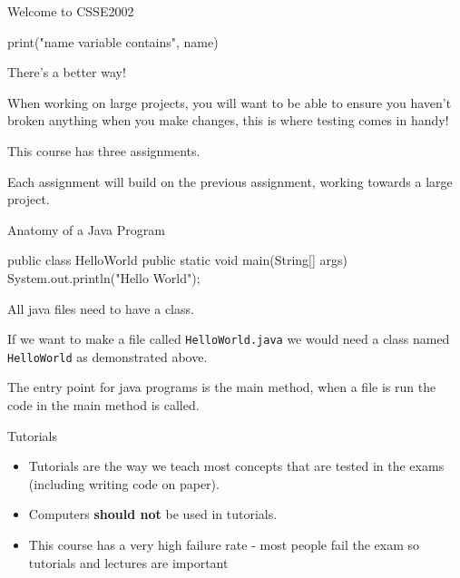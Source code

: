 \documentclass[week2]{csse2002}
\begin{document}
\begin{topic}{Welcome to CSSE2002}
\begin{subtopic}{5}
\begin{python}
print("name variable contains", name)
\end{python}

There's a better way!
\end{subtopic}

\begin{subtopic}{6}
When working on large projects, you will want to be able to ensure you haven't broken anything when you make changes, this is where testing comes in handy!
\end{subtopic}

\begin{subtopic}{7}
This course has three assignments.

Each assignment will build on the previous assignment, working towards a large project.
\end{subtopic}

\end{topic}

\begin{topic}{Anatomy of a Java Program}
\begin{java}
public class HelloWorld {
    public static void main(String[] args) {
        System.out.println("Hello World");
    }
}
\end{java}

All java files need to have a class.

If we want to make a file called \texttt{HelloWorld.java} we would need a class named \texttt{HelloWorld} as demonstrated above.

The entry point for java programs is the main method, when a file is run the code in the main method is called.
\end{topic}

\begin{topic}{Tutorials}
\begin{itemize}
\item Tutorials are the way we teach most concepts that are tested in the exams (including writing code on paper).

\item Computers \textbf{should not} be used in tutorials.

\item This course has a very high failure rate - most people fail the exam so tutorials and lectures are important
\end{itemize}
\end{topic}
\end{document}
